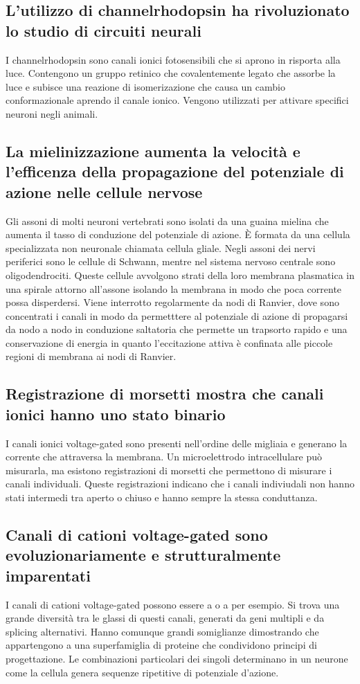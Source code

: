 \subsection{L'utilizzo di channelrhodopsin ha rivoluzionato lo studio di circuiti neurali}
I channelrhodopsin sono canali ionici fotosensibili che si aprono in risporta alla luce. Contengono un gruppo retinico che covalentemente legato che assorbe la luce e subisce una 
reazione di isomerizazione che causa un cambio conformazionale aprendo il canale ionico. Vengono utilizzati per attivare specifici neuroni  negli animali.
\subsection{La mielinizzazione aumenta la velocit\`a e l'efficenza della propagazione del potenziale di azione nelle cellule nervose}
Gli assoni di molti neuroni vertebrati sono isolati da una guaina mielina che aumenta il tasso di conduzione del potenziale di azione. \`E formata da una cellula specializzata non
neuronale chiamata cellula gliale. Negli assoni dei nervi periferici sono le cellule di Schwann, mentre nel sistema nervoso centrale sono oligodendrociti. Queste cellule avvolgono 
strati della loro membrana plasmatica in una spirale attorno all'assone isolando la membrana in modo che poca corrente possa disperdersi. Viene interrotto regolarmente da nodi di
Ranvier, dove sono concentrati i canali  in modo da permetttere al potenziale di azione di propagarsi da nodo a nodo in conduzione saltatoria che permette un trapsorto rapido
e una conservazione di energia in quanto l'eccitazione attiva \`e confinata alle piccole regioni di membrana ai nodi di Ranvier.
\subsection{Registrazione di morsetti mostra che canali ionici hanno uno stato binario}
I canali ionici voltage-gated sono presenti nell'ordine delle migliaia e generano la corrente che attraversa la membrana. Un microelettrodo intracellulare pu\`o misurarla, ma esistono
registrazioni di morsetti che permettono di misurare i canali individuali. Queste registrazioni indicano che i canali indiviudali non hanno stati intermedi tra aperto o chiuso e 
hanno sempre la stessa conduttanza. 
\subsection{Canali di cationi voltage-gated sono evoluzionariamente e strutturalmente imparentati}
I canali di cationi voltage-gated possono essere a  o a  per esempio. Si trova una grande diversit\`a tra le glassi di questi canali, generati da geni multipli e 
da splicing alternativi. Hanno comunque grandi somiglianze dimostrando che appartengono a una superfamiglia di proteine che condividono principi di progettazione. Le combinazioni
particolari dei singoli determinano in un neurone come la cellula genera sequenze ripetitive di potenziale d'azione.

